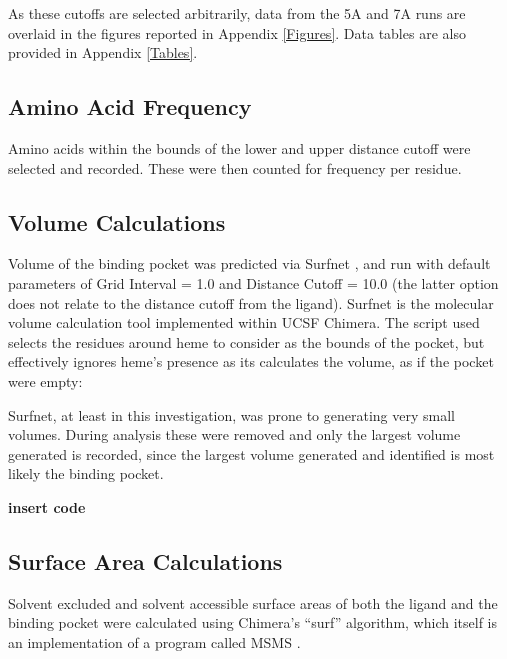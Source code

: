 \documentclass[a4paper, nobind]{templates/ociamthesis}
\begin{document}
As these cutoffs are selected arbitrarily, data from the 5A and 7A runs are overlaid in the figures reported in Appendix \ref{Figures}. Data tables are also provided in Appendix \ref{Tables}.

\hypertarget{amino-acid-frequency}{%
\subsection{Amino Acid Frequency}\label{amino-acid-frequency}}

Amino acids within the bounds of the lower and upper distance cutoff were selected and recorded. These were then counted for frequency per residue.

\hypertarget{volume-calculations}{%
\subsection{Volume Calculations}\label{volume-calculations}}

Volume of the binding pocket was predicted via Surfnet \autocite{Laskowski1995}, and run with default parameters of Grid Interval = 1.0 and Distance Cutoff = 10.0 (the latter option does not relate to the distance cutoff from the ligand). Surfnet is the molecular volume calculation tool implemented within UCSF Chimera. The script used selects the residues around heme to consider as the bounds of the pocket, but effectively ignores heme's presence as its calculates the volume, as if the pocket were empty:

Surfnet, at least in this investigation, was prone to generating very small volumes. During analysis these were removed and only the largest volume generated is recorded, since the largest volume generated and identified is most likely the binding pocket.

\textbf{insert code}

\hypertarget{surface-area-calculations}{%
\subsection{Surface Area Calculations}\label{surface-area-calculations}}

Solvent excluded and solvent accessible surface areas of both the ligand and the binding pocket were calculated using Chimera's ``surf'' algorithm, which itself is an implementation of a program called MSMS \autocite{Sanner1996}.
\end{document}
